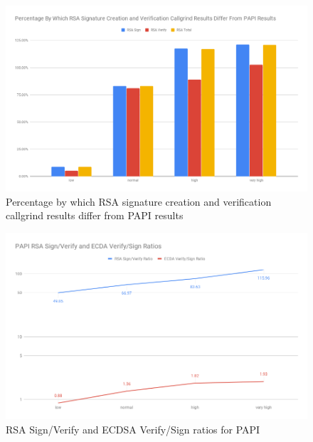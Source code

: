 \documentclass{llncs}
\begin{document}
\begin{figure}
  \centering
  \includegraphics[width=1.0\textwidth]{img/papi-vs-callgrind-rsa-cost.png}
  \centering \caption{\label{fig:papi-vs-callgrind-rsa-cost} Percentage by which RSA signature creation and verification callgrind results differ from PAPI results}
\end{figure}

\begin{figure}
  \centering
  \includegraphics[width=1.0\textwidth]{img/rsa-ecdsa-pub-priv-ratio-papi.png}
  \centering \caption{\label{fig:rsa-ecdsa-pub-priv-ratio-papi} RSA Sign/Verify and ECDSA Verify/Sign ratios for PAPI}
\end{figure}
\end{document}
